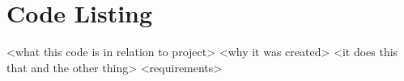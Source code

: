 \chapter{Code Listing}

<what this code is in relation to project>
<why it was created>
<it does this that and the other thing>
<requirements>

\inputminted[tabsize=2,breaklines,breakanywhere]{bash}{../project/run.sh}
